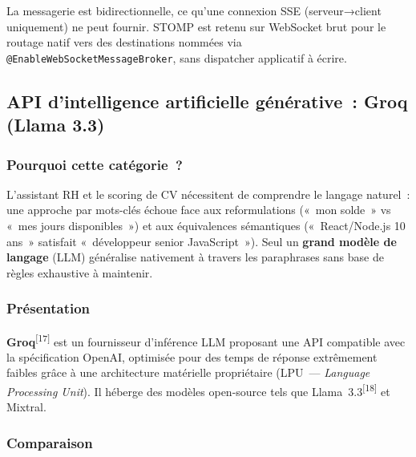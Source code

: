 La messagerie est bidirectionnelle, ce qu'une connexion SSE (serveur→client uniquement) ne peut fournir. STOMP est retenu sur WebSocket brut pour le routage natif vers des destinations nommées via \texttt{@EnableWebSocketMessageBroker}, sans dispatcher applicatif à écrire.

\subsection{API d'intelligence artificielle générative~: Groq (Llama 3.3)}

\subsubsection*{Pourquoi cette catégorie~?}

L'assistant RH et le scoring de CV nécessitent de comprendre le langage naturel~: une approche par mots-clés échoue face aux reformulations («~mon solde~» vs «~mes jours disponibles~») et aux équivalences sémantiques («~React/Node.js 10 ans~» satisfait «~développeur senior JavaScript~»). Seul un \textbf{grand modèle de langage} (LLM) généralise nativement à travers les paraphrases sans base de règles exhaustive à maintenir.

\subsubsection*{Présentation}

\textbf{Groq}\textsuperscript{[17]} est un fournisseur d'inférence LLM proposant une API compatible avec
la spécification OpenAI, optimisée pour des temps de réponse extrêmement faibles
grâce à une architecture matérielle propriétaire (LPU~--- \textit{Language Processing
Unit}). Il héberge des modèles open-source tels que Llama~3.3\textsuperscript{[18]} et Mixtral.

\subsubsection*{Comparaison}


